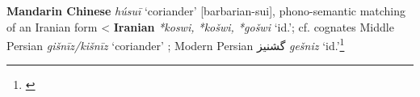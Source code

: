 \begin{etymology}\label{ety:husui}
\textbf{Mandarin Chinese}  \textit{húsuī} `coriander' [barbarian-sui], phono-semantic matching of an Iranian form
< \textbf{Iranian} \textit{*koswi, *košwi, *gošwi} `id.'; cf. cognates Middle Persian \textit{gišnīz/kišnīz} `coriander'  ; Modern Persian گشنیز \textit{gešniz} `id.'\footnote{\textcite{laufer_sino-iranica_1919}}
\end{etymology}